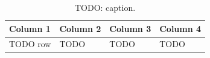 \begin{table}[tbp]
  \centering
  \caption{TODO: caption.}
  \label{tab:template-01}
  \small
  \begin{tabularx}{\textwidth}{@{}>{\raggedright\arraybackslash}p{}>{\raggedright\arraybackslash}X>{\raggedright\arraybackslash}p{}>{\raggedright\arraybackslash}p{}@{}}
    \toprule
    Column 1 & Column 2 & Column 3 & Column 4 \\
    \midrule
    TODO row
      & TODO
      & TODO
      & TODO \\
    \bottomrule
  \end{tabularx}
\end{table}
